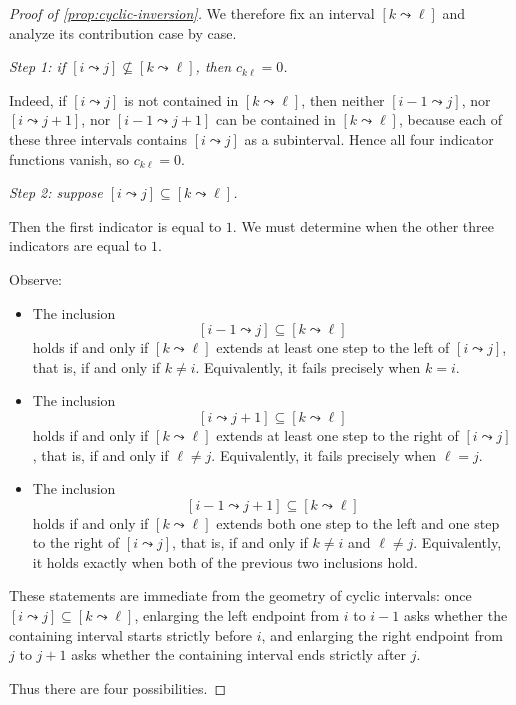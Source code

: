 \documentclass{article}
\theoremstyle{definition}
\begin{document}
\begin{proof}[Proof of \ref{prop:cyclic-inversion}]
We therefore fix an interval $[k\leadsto \ell]$ and analyze its
contribution case by case.

\medskip
\noindent
\emph{Step 1: if $[i\leadsto j]\not\subseteq [k\leadsto \ell]$, then $c_{k\ell}=0$.}

Indeed, if $[i\leadsto j]$ is not contained in $[k\leadsto \ell]$, then neither
$[i-1\leadsto j]$, nor $[i\leadsto j+1]$, nor $[i-1\leadsto j+1]$ can be
contained in $[k\leadsto \ell]$, because each of these three intervals
contains $[i\leadsto j]$ as a subinterval. Hence all four indicator functions
vanish, so $c_{k\ell}=0$.

\medskip
\noindent
\emph{Step 2: suppose $[i\leadsto j]\subseteq [k\leadsto \ell]$.}

Then the first indicator is equal to $1$. We must determine when the other
three indicators are equal to $1$.

Observe:

\begin{itemize}
\item The inclusion
\[
[i-1\leadsto j]\subseteq [k\leadsto \ell]
\]
holds if and only if $[k\leadsto \ell]$ extends at least one step to the left
of $[i\leadsto j]$, that is, if and only if $k\neq i$.
Equivalently, it fails precisely when $k=i$.

\item The inclusion
\[
[i\leadsto j+1]\subseteq [k\leadsto \ell]
\]
holds if and only if $[k\leadsto \ell]$ extends at least one step to the right
of $[i\leadsto j]$, that is, if and only if $\ell\neq j$.
Equivalently, it fails precisely when $\ell=j$.

\item The inclusion
\[
[i-1\leadsto j+1]\subseteq [k\leadsto \ell]
\]
holds if and only if $[k\leadsto \ell]$ extends both one step to the left and
one step to the right of $[i\leadsto j]$, that is, if and only if
$k\neq i$ and $\ell\neq j$.
Equivalently, it holds exactly when both of the previous two inclusions hold.
\end{itemize}

These statements are immediate from the geometry of cyclic intervals:
once $[i\leadsto j]\subseteq [k\leadsto \ell]$, enlarging the left endpoint
from $i$ to $i-1$ asks whether the containing interval starts strictly before
$i$, and enlarging the right endpoint from $j$ to $j+1$ asks whether the
containing interval ends strictly after $j$.

Thus there are four possibilities.


\end{proof}
\end{document}
